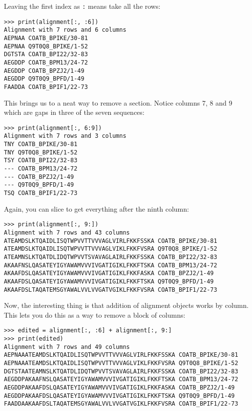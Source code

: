 Leaving the first index as \verb|:| means take all the rows:

\begin{verbatim}
>>> print(alignment[:, :6])
Alignment with 7 rows and 6 columns
AEPNAA COATB_BPIKE/30-81
AEPNAA Q9T0Q8_BPIKE/1-52
DGTSTA COATB_BPI22/32-83
AEGDDP COATB_BPM13/24-72
AEGDDP COATB_BPZJ2/1-49
AEGDDP Q9T0Q9_BPFD/1-49
FAADDA COATB_BPIF1/22-73
\end{verbatim}

This brings us to a neat way to remove a section. Notice columns
7, 8 and 9 which are gaps in three of the seven sequences:

\begin{verbatim}
>>> print(alignment[:, 6:9])
Alignment with 7 rows and 3 columns
TNY COATB_BPIKE/30-81
TNY Q9T0Q8_BPIKE/1-52
TSY COATB_BPI22/32-83
--- COATB_BPM13/24-72
--- COATB_BPZJ2/1-49
--- Q9T0Q9_BPFD/1-49
TSQ COATB_BPIF1/22-73
\end{verbatim}

\noindent Again, you can slice to get everything after the ninth column:

\begin{verbatim}
>>> print(alignment[:, 9:])
Alignment with 7 rows and 43 columns
ATEAMDSLKTQAIDLISQTWPVVTTVVVAGLVIRLFKKFSSKA COATB_BPIKE/30-81
ATEAMDSLKTQAIDLISQTWPVVTTVVVAGLVIKLFKKFVSRA Q9T0Q8_BPIKE/1-52
ATEAMNSLKTQATDLIDQTWPVVTSVAVAGLAIRLFKKFSSKA COATB_BPI22/32-83
AKAAFNSLQASATEYIGYAWAMVVVIVGATIGIKLFKKFTSKA COATB_BPM13/24-72
AKAAFDSLQASATEYIGYAWAMVVVIVGATIGIKLFKKFASKA COATB_BPZJ2/1-49
AKAAFDSLQASATEYIGYAWAMVVVIVGATIGIKLFKKFTSKA Q9T0Q9_BPFD/1-49
AKAAFDSLTAQATEMSGYAWALVVLVVGATVGIKLFKKFVSRA COATB_BPIF1/22-73
\end{verbatim}

\noindent Now, the interesting thing is that addition of alignment objects works
by column. This lets you do this as a way to remove a block of columns:

\begin{verbatim}
>>> edited = alignment[:, :6] + alignment[:, 9:]
>>> print(edited)
Alignment with 7 rows and 49 columns
AEPNAAATEAMDSLKTQAIDLISQTWPVVTTVVVAGLVIRLFKKFSSKA COATB_BPIKE/30-81
AEPNAAATEAMDSLKTQAIDLISQTWPVVTTVVVAGLVIKLFKKFVSRA Q9T0Q8_BPIKE/1-52
DGTSTAATEAMNSLKTQATDLIDQTWPVVTSVAVAGLAIRLFKKFSSKA COATB_BPI22/32-83
AEGDDPAKAAFNSLQASATEYIGYAWAMVVVIVGATIGIKLFKKFTSKA COATB_BPM13/24-72
AEGDDPAKAAFDSLQASATEYIGYAWAMVVVIVGATIGIKLFKKFASKA COATB_BPZJ2/1-49
AEGDDPAKAAFDSLQASATEYIGYAWAMVVVIVGATIGIKLFKKFTSKA Q9T0Q9_BPFD/1-49
FAADDAAKAAFDSLTAQATEMSGYAWALVVLVVGATVGIKLFKKFVSRA COATB_BPIF1/22-73
\end{verbatim}

